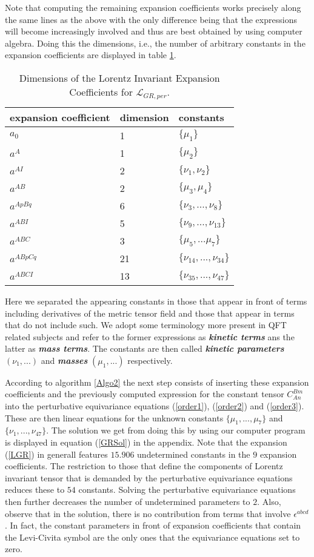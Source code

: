 Note that computing the remaining expansion coefficients works precisely along the same lines as the above with the only difference being that the expressions will become increasingly involved and thus are best obtained by using computer algebra.
Doing this the dimensions, i.e., the number of arbitrary constants in the expansion coefficients are displayed in table \ref{GRExp}.
\begin{table}
\centering 
\begin{tabular}{lll}\toprule
    expansion coefficient & dimension & constants   \\ \midrule
    $a_0$ & 1 & $\{\mu_1\}$ \\
    $a^A$ & 1 & $\{\mu_2\}$ \\
    $a^{AI}$ & 2 & $\{\nu_1, \nu_2\}$ \\
    $a^{AB}$ & 2 & $\{\mu_3, \mu_4 \} $ \\
    $a^{ApBq}$ & 6 & $\{\nu_3,...,\nu_8\}$ \\
    $a^{ABI}$ & 5 & $\{ \nu_9,...,\nu_{13} \}$ \\
    $a^{ABC}$ & 3 & $\{ \mu_5,...\mu_7 \}$\\
    $a^{ABpCq}$ & 21 & $\{\nu_{14},...,\nu_{34} \}$ \\
    $a^{ABCI}$ & 13 & $\{ \nu_{35},...,\nu_{47}\}$\\ \bottomrule
\end{tabular}
\caption{Dimensions of the Lorentz Invariant Expansion Coefficients for $\mathcal{L}_{GR,per}$.}\label{GRExp}
\end{table}
Here we separated the appearing constants in those that appear in front of terms including derivatives of the metric tensor field and those that appear in terms that do not include such. We adopt some terminology more present in QFT related subjects and refer to the former expressions as \textbf{\textit{kinetic terms}} ans the latter as \textit{\textbf{mass terms}}. The constants are then called \textit{\textbf{kinetic parameters}} $(\nu_1,...)$ and \textit{\textbf{masses}} $(\mu_1,...)$ respectively.   

According to algorithm \ref{Algo2} the next step consists of inserting these expansion coefficients and the previously computed expression for the constant tensor $C_{An}^{Bm}$ into the perturbative equivariance equations (\ref{order1}), (\ref{order2}) and (\ref{order3}). These are then linear equations for the unknown constants $\{ \mu_1,...,\mu_7\}$ and $\{\nu_1,...,\nu_{47}\}$. The solution we get from doing this by using our computer program is displayed in equation (\ref{GRSol}) in the appendix. Note that the expansion (\ref{LGR}) in generall features $15.906$ undetermined constants in the $9$ expansion coefficients. The restriction to those that define the components of Lorentz invariant tensor that is demanded by the perturbative equivariance equations reduces these to $54$ constants. Solving the perturbative equivariance equations then further decreases the number of undetermined parameters to $2$. Also, observe that in the solution, there is no contribution from terms that involve $\epsilon^{abcd}$. In fact, the constant parameters in front of expansion coefficients that contain the Levi-Civita symbol are the only ones that the equivariance equations set to zero.  

